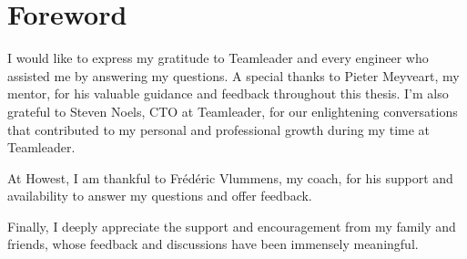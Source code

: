 \newpage
\thispagestyle{empty}

\section*{Foreword}

I would like to express my gratitude to Teamleader and every engineer who assisted me by answering my questions. A special thanks to Pieter Meyveart, my mentor, for his valuable guidance and feedback throughout this thesis. I'm also grateful to Steven Noels, CTO at Teamleader, for our enlightening conversations that contributed to my personal and professional growth during my time at Teamleader.

At Howest, I am thankful to Frédéric Vlummens, my coach, for his support and availability to answer my questions and offer feedback.

Finally, I deeply appreciate the support and encouragement from my family and friends, whose feedback and discussions have been immensely meaningful. 
